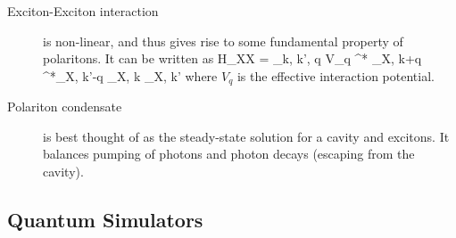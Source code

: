 \begin{description}
\item[Exciton-Exciton interaction] is non-linear, and thus gives rise to some fundamental property of polaritons.  It can be written as
\beq
H_{XX} =  \sum_{k, k', q}  V_q \psi^* _{X, k+q} \psi^*_{X, k'-q} \psi_{X, k} \psi_{X, k'}
\eeq
where $V_q$ is the effective interaction potential. 


\item[Polariton condensate] is best thought of as the steady-state solution for a cavity and excitons. It balances pumping of photons and photon decays (escaping from the cavity). 


\end{description}

\subsection{Quantum Simulators}
